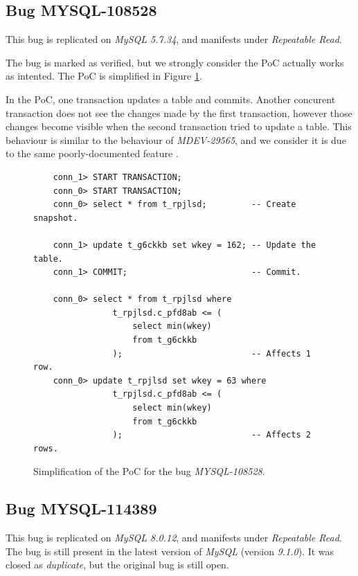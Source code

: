 \subsection*{Bug MYSQL-108528}

This bug is replicated on \textit{MySQL 5.7.34}, and manifests under \textit{Repeatable Read}.

The bug is marked as verified, but we strongly consider the PoC actually works as intented. The PoC is simplified in Figure \ref{fig:MYSQL-108528}.

In the PoC, one transaction updates a table and commits. Another concurent transaction does not see the changes made by the first transaction, however those changes become visible when the second transaction tried to update a table. This behaviour is similar to the behaviour of \textit{MDEV-29565}, and we consider it is due to the same poorly-documented feature \cite{mysqlconsistentread}.


\begin{figure}
\begin{verbatim}
    conn_1> START TRANSACTION;
    conn_0> START TRANSACTION;
    conn_0> select * from t_rpjlsd;         -- Create snapshot.

    conn_1> update t_g6ckkb set wkey = 162; -- Update the table.
    conn_1> COMMIT;                         -- Commit.

    conn_0> select * from t_rpjlsd where
                t_rpjlsd.c_pfd8ab <= (
                    select min(wkey)
                    from t_g6ckkb
                );                          -- Affects 1 row.
    conn_0> update t_rpjlsd set wkey = 63 where
                t_rpjlsd.c_pfd8ab <= (
                    select min(wkey)
                    from t_g6ckkb
                );                          -- Affects 2 rows.
\end{verbatim}
\caption{Simplification of the PoC for the bug \textit{MYSQL-108528}.} \label{fig:MYSQL-108528}
\end{figure}



\subsection*{Bug MYSQL-114389}

This bug is replicated on \textit{MySQL 8.0.12}, and manifests under \textit{Repeatable Read}. The bug is still present in the latest version of \textit{MySQL} (version \textit{9.1.0}). It was closed as \textit{duplicate}, but the original bug is still open.


